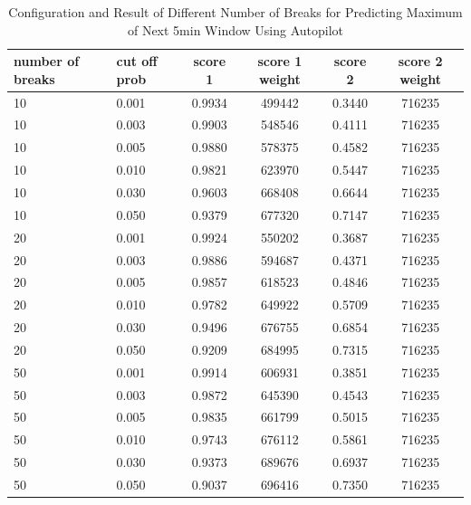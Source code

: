 \documentclass{article}
\begin{document}
\begin{longtable}[htbp]{l|l|*{4}{c}}
  \caption{Configuration and Result of Different Number of Breaks for Predicting Maximum of Next 5min Window Using Autopilot}
  \label{tab:tab1.11.4} \\
  \textbf{number of breaks} & \textbf{cut off
  prob} & \textbf{score 1} & \textbf{score 1 weight} & \textbf{score 2} &
  \textbf{score 2 weight} \\ 
  \hline
  10 & 0.001 & 0.9934 & 499442 & 0.3440 & 716235\\
  10 & 0.003 & 0.9903 & 548546 & 0.4111 & 716235\\
  10 & 0.005 & 0.9880 & 578375 & 0.4582 & 716235\\
  10 & 0.010 & 0.9821 & 623970 & 0.5447 & 716235\\
  10 & 0.030 & 0.9603 & 668408 & 0.6644 & 716235\\
  10 & 0.050 & 0.9379 & 677320 & 0.7147 & 716235\\
  20 & 0.001 & 0.9924 & 550202 & 0.3687 & 716235\\
  20 & 0.003 & 0.9886 & 594687 & 0.4371 & 716235\\
  20 & 0.005 & 0.9857 & 618523 & 0.4846 & 716235\\
  20 & 0.010 & 0.9782 & 649922 & 0.5709 & 716235\\
  20 & 0.030 & 0.9496 & 676755 & 0.6854 & 716235\\
  20 & 0.050 & 0.9209 & 684995 & 0.7315 & 716235\\
  50 & 0.001 & 0.9914 & 606931 & 0.3851 & 716235\\
  50 & 0.003 & 0.9872 & 645390 & 0.4543 & 716235\\
  50 & 0.005 & 0.9835 & 661799 & 0.5015 & 716235\\
  50 & 0.010 & 0.9743 & 676112 & 0.5861 & 716235\\
  50 & 0.030 & 0.9373 & 689676 & 0.6937 & 716235\\
  50 & 0.050 & 0.9037 & 696416 & 0.7350 & 716235\\
\end{longtable}
\end{document}
